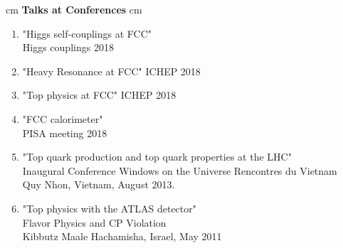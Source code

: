 \documentclass[12pt]{article}
\begin{document}
 cm
{\bf  \large  Talks at Conferences}
 cm
\begin{enumerate} 

\item "Higgs self-couplings at FCC"\\
Higgs couplings 2018

\item "Heavy Resonance at FCC"
ICHEP 2018

\item "Top physics at FCC"
ICHEP 2018

\item "FCC calorimeter"\\
PISA meeting 2018 

\item "Top quark production and top quark properties at the LHC"\\
Inaugural Conference Windows on the Universe Rencontres du Vietnam \\
Quy Nhon, Vietnam, August 2013.

\item "Top physics with the ATLAS detector"\\
Flavor Physics and CP Violation\\ 
Kibbutz Maale Hachamisha, Israel, May 2011

\end{enumerate}
\end{document}
